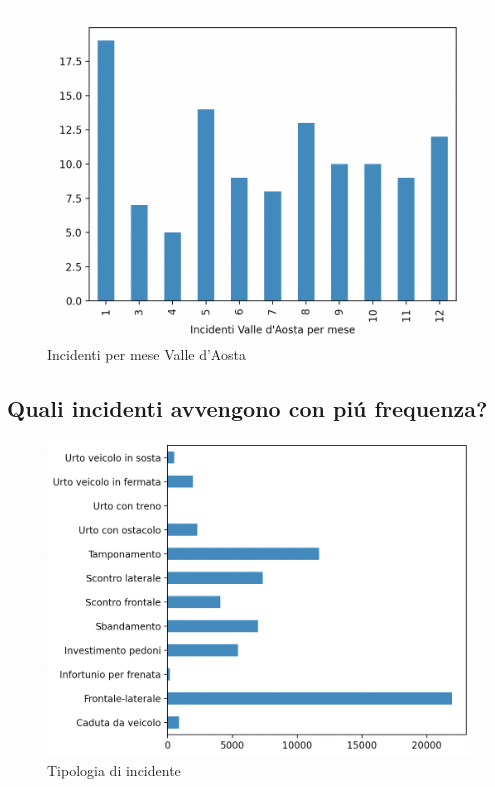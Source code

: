 \documentclass[a4paper]{report}
\begin{document}
\begin{figure}[!ht]
    \includegraphics[width=\linewidth]{../src/incidenti/incidenti_senza_coords/mese_incidenti/valle_aosta.png}
    \caption{Incidenti per mese Valle d'Aosta}
    \label{fig:aosta}
\end{figure}


\newpage
\subsection{Quali incidenti avvengono con pi\'u frequenza?}

\begin{figure}[!ht]
    \includegraphics[width=\linewidth]{../src/incidenti/incidenti_senza_coords/localizzazione_incidente/tipo_incidente.png}
    \caption{Tipologia di incidente}
    \label{fig:tipo_incidente}
\end{figure}
\end{document}
